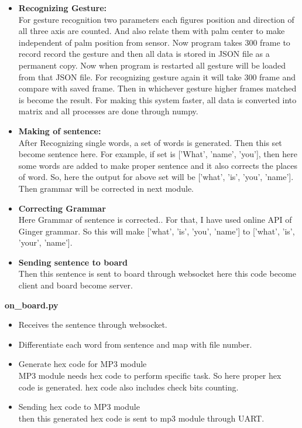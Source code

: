\documentclass[a4paper,12pt,oneside]{book}
\begin{document}
\begin{itemize}
\item \textbf{Recognizing Gesture:}\\
For gesture recognition two parameters each figures position and direction of all three axis are counted. And also relate them with palm center to make independent of palm position from sensor. Now program takes 300 frame to record record the gesture and then all data is stored in JSON file as a permanent copy. Now when program is restarted all gesture will be loaded from that JSON file. For recognizing gesture again it will take 300 frame and compare with saved frame. Then in whichever gesture higher frames matched is become  the result. For making this system faster, all data is converted into matrix and all processes are done through numpy. 
\item \textbf{Making of sentence:}\\
After Recognizing single words, a set of words is generated. Then this set become sentence here. For example, if set is ['What', 'name', 'you'], then here some words are added to make proper sentence and it also corrects the places of word. So, here the output for above set will be ['what', 'is', 'you', 'name']. Then grammar will be corrected in next module.
\item \textbf{Correcting Grammar}\\
Here Grammar of sentence is corrected.. For that, I have used online API of Ginger grammar. So this will make ['what', 'is', 'you', 'name'] to ['what', 'is', 'your', 'name'].
\item \textbf{Sending sentence to board}\\
Then this sentence is sent to board through websocket here this code become client and board become server.
\end{itemize}
\textbf{\Large{on\_board.py}}
\begin{itemize}
\item Receives the sentence through websocket.
\item Differentiate each word from sentence and map with file number.
\item Generate hex code for MP3 module\\
MP3 module needs hex code to perform specific task. So here proper hex code is generated. hex code also includes check bits counting.
\item Sending hex code to MP3 module\\
then this generated hex code is sent to mp3 module through UART.
\end{itemize}
\end{document}
